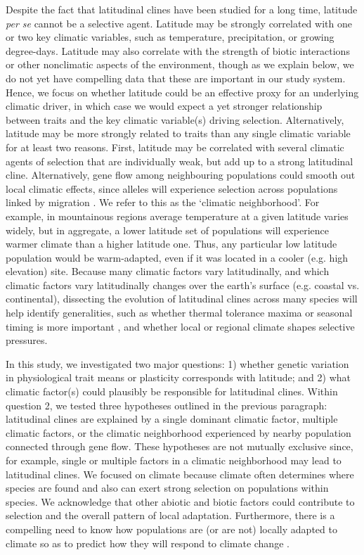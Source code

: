 \documentclass[11pt, oneside]{article}
\begin{document}
Despite the fact that latitudinal clines have been studied for a long time, latitude \textit{per se} cannot be a selective agent. Latitude may be strongly correlated with one or two key climatic variables, such as temperature, precipitation, or growing degree-days. Latitude may also correlate with the strength of biotic interactions \citep{Schemske_etal_2009} or other nonclimatic aspects of the environment, though as we explain below, we do not yet have compelling data that these are important in our study system. Hence, we focus on whether latitude could be an effective proxy for an underlying climatic driver, in which case we would expect a yet stronger relationship between traits and the key climatic variable(s) driving selection. Alternatively, latitude may be more strongly related to traits than any single climatic variable for at least two reasons. First, latitude may be correlated with several climatic agents of selection that are individually weak, but add up to a strong latitudinal cline. Alternatively, gene flow among neighbouring populations could smooth out local climatic effects, since alleles will experience selection across populations linked by migration \citep{Slatkin_1978, Paul_etal_2011, Hadfield_2016}. We refer to this as the `climatic neighborhood'. For example, in mountainous regions average temperature at a given latitude varies widely, but in aggregate, a lower latitude set of populations will experience warmer climate than a higher latitude one. Thus, any particular low latitude population would be warm-adapted, even if it was located in a cooler (e.g. high elevation) site. Because many climatic factors vary latitudinally, and which climatic factors vary latitudinally changes over the earth's surface (e.g. coastal vs. continental), dissecting the evolution of latitudinal clines across many species will help identify generalities, such as whether thermal tolerance maxima or seasonal timing is more important \citep{Bradshaw_Holzapfel_2008}, and whether local or regional climate shapes selective pressures.

In this study, we investigated two major questions: 1) whether genetic variation in physiological trait means or plasticity corresponds with latitude; and 2) what climatic factor(s) could plausibly be responsible for latitudinal clines. Within question 2, we tested three hypotheses outlined in the previous paragraph: latitudinal clines are explained by a single dominant climatic factor, multiple climatic factors, or the climatic neighborhood experienced by nearby population connected through gene flow. These hypotheses are not mutually exclusive since, for example, single or multiple factors in a climatic neighborhood may lead to latitudinal clines. We focused on climate because climate often determines where species are found and also can exert strong selection on populations within species. We acknowledge that other abiotic and biotic factors could contribute to selection and the overall pattern of local adaptation. Furthermore, there is a compelling need to know how populations are (or are not) locally adapted to climate so as to predict how they will respond to climate change \citep{Aitken_Whitlock_2013}. 
\end{document}

